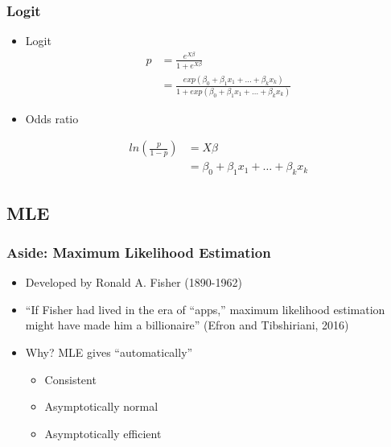 \documentclass[
  shownotes,
  xcolor={svgnames},
  hyperref={colorlinks,citecolor=DarkBlue,linkcolor=andesred,urlcolor=DarkBlue}
  , aspectratio=169]{beamer}
\begin{document}
\begin{frame}[fragile]
\frametitle{Logit}

\begin{itemize}
\item Logit
\begin{align}
p &=\frac{e^{X\beta}}{1+e^{X\beta}} \\ \nonumber
          &=\frac{exp(\beta_0 +\beta_1 x_1 + \dots +\beta_k x_k)}{1+exp(\beta_0 +\beta_1 x_1 + \dots +\beta_k x_k)}
\end{align}

\pause
\item Odds ratio

\begin{align}
ln\left( \frac{p}{1-p}\right) &=X\beta  \\ \nonumber
          &=\beta_0 +\beta_1 x_1 + \dots +\beta_k x_k
\end{align}
\end{itemize}
\end{frame}

\subsection{MLE}

\begin{frame}[fragile]
\frametitle{Aside: Maximum Likelihood Estimation}

\begin{itemize}
    
    \item Developed by Ronald A. Fisher (1890-1962)
    \bigskip
    \item ``If Fisher had lived in the era of ``apps,'' maximum likelihood estimation might have made him a billionaire'' (Efron and Tibshiriani, 2016)
    \bigskip
    \item  Why? MLE gives ``automatically''
    \begin{itemize}    
      \bigskip
      \item Consistent 
      \medskip
      \item Asymptotically normal
      \medskip
      \item  Asymptotically efficient
    \end{itemize} 
\end{itemize}
 
\end{frame}
\end{document}
